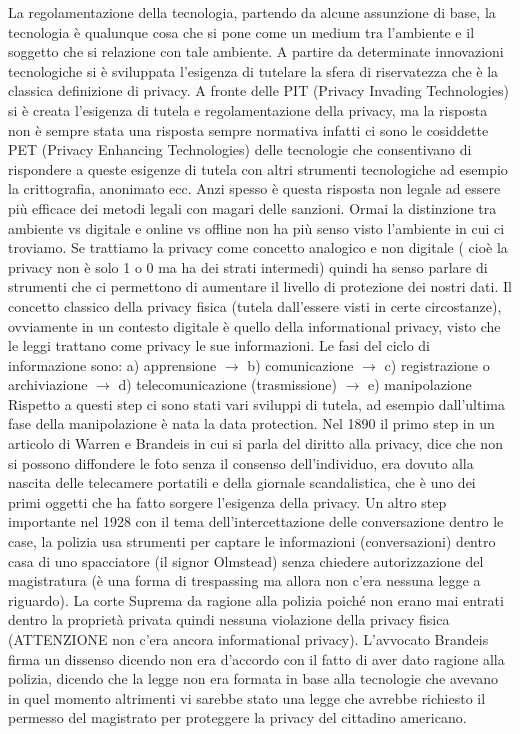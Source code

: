 \documentclass[a4page, 11pt, twocolumn]{article}
\begin{document}
La regolamentazione della tecnologia, partendo da alcune assunzione di base, la tecnologia è qualunque cosa che si pone come un medium tra l’ambiente e il soggetto che si relazione con tale ambiente. A partire da determinate innovazioni tecnologiche si è sviluppata l’esigenza di tutelare la sfera di riservatezza che è la classica definizione di privacy. A fronte delle PIT (Privacy Invading Technologies) si è creata l’esigenza di tutela e regolamentazione della privacy, ma la risposta non è sempre stata una risposta sempre normativa infatti ci sono le cosiddette PET (Privacy Enhancing Technologies) delle tecnologie che consentivano di rispondere a queste esigenze di tutela con altri strumenti tecnologiche ad esempio la crittografia, anonimato ecc. Anzi spesso è questa risposta non legale ad essere più efficace dei metodi legali con magari delle sanzioni. Ormai la distinzione tra ambiente vs digitale e online vs offline non ha più senso visto l’ambiente in cui ci troviamo. \newline
Se trattiamo la privacy come concetto analogico e non digitale ( cioè la privacy non è solo 1 o 0 ma ha dei strati intermedi) quindi ha senso parlare di strumenti che ci permettono di aumentare il livello di protezione dei nostri dati. Il concetto classico della privacy fisica (tutela dall’essere visti in certe circostanze), ovviamente in un contesto digitale è quello della informational privacy, visto che le leggi trattano come privacy le sue informazioni. \newline
Le fasi del ciclo di informazione sono: 
a) apprensione $\rightarrow$ b) comunicazione $\rightarrow$ c) registrazione o archiviazione $\rightarrow$ d) telecomunicazione (trasmissione) $\rightarrow$ e) manipolazione \newline
Rispetto a questi step ci sono stati vari sviluppi di tutela, ad esempio dall’ultima fase della manipolazione è nata la data protection. Nel 1890 il primo step in un articolo di Warren e Brandeis in cui si parla del diritto alla privacy, dice che non si possono diffondere le foto senza il consenso dell’individuo, era dovuto alla nascita delle telecamere portatili e della giornale scandalistica, che è uno dei primi oggetti che ha fatto sorgere l’esigenza della privacy.\newline
Un altro step importante nel 1928 con il tema dell’intercettazione delle conversazione dentro le case, la polizia usa strumenti per captare le informazioni (conversazioni) dentro casa di uno spacciatore (il signor Olmstead) senza chiedere autorizzazione del magistratura (è una forma di trespassing ma allora non c’era nessuna legge a riguardo). La corte Suprema da ragione alla polizia poiché non erano mai entrati dentro la proprietà privata quindi nessuna violazione della privacy fisica (ATTENZIONE non c’era ancora informational privacy). L’avvocato Brandeis firma un dissenso dicendo non era d’accordo con il fatto di aver dato ragione alla polizia, dicendo che la legge non era formata in base alla tecnologie che avevano in quel momento altrimenti vi sarebbe stato una legge che avrebbe richiesto il permesso del magistrato per proteggere la privacy del cittadino americano. \newline
\end{document}
